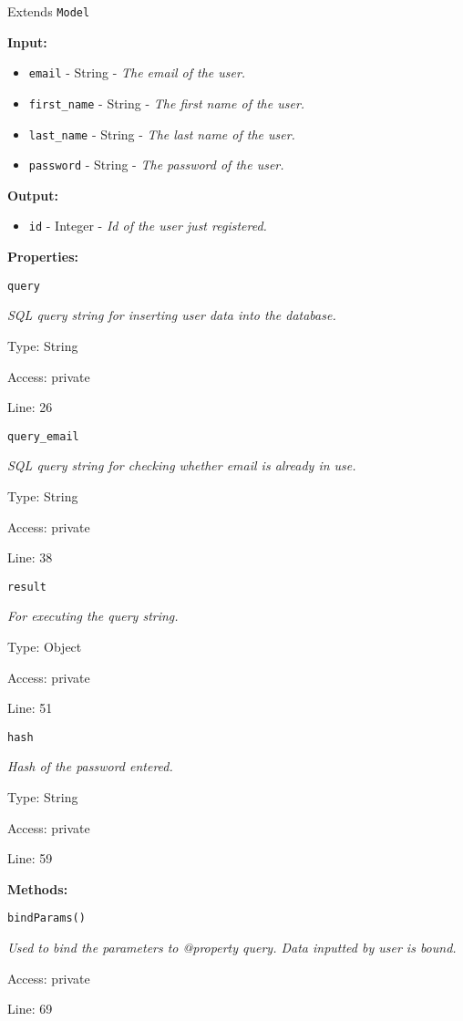 Extends \texttt{Model}

\textbf{Input:}
\begin{itemize}
\item \texttt{email} - String - \textit{The email of the user.}
\item \texttt{first\_name} - String - \textit{The first name of the user.}
\item \texttt{last\_name} - String - \textit{The last name of the user.}
\item \texttt{password} - String - \textit{The password of the user.}
\end{itemize}

\textbf{Output:}
\begin{itemize}
\item \texttt{id} - Integer - \textit{Id of the user just registered.}
\end{itemize}

\textbf{Properties:}

\texttt{query}

{\scriptsize
\textit{SQL query string for inserting user data into the database.}

Type: String

Access: private

Line: 26

}
\texttt{query\_email}

{\scriptsize
\textit{SQL query string for checking whether email is already in use.}

Type: String

Access: private

Line: 38

}
\texttt{result}

{\scriptsize
\textit{For executing the query string.}

Type: Object

Access: private

Line: 51

}
\texttt{hash}

{\scriptsize
\textit{Hash of the password entered.}

Type: String

Access: private

Line: 59

}
\textbf{Methods:}

\texttt{bindParams()}

{\scriptsize
\textit{Used to bind the parameters to @property query.
Data inputted by user is bound.}

Access: private

Line: 69

}

